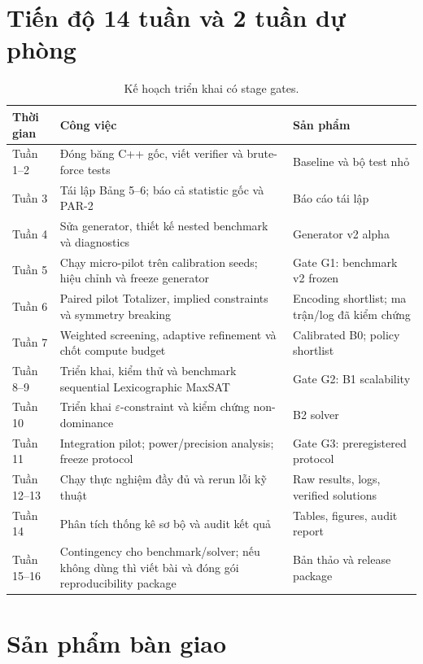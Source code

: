 \documentclass[12pt,a4paper]{article}
\begin{document}
\clearpage
\section{Tiến độ 14 tuần và 2 tuần dự phòng}

\begin{table}[H]
\centering
\caption{Kế hoạch triển khai có stage gates.}
\begin{tabularx}{\textwidth}{@{}p{2cm}Yp{4cm}@{}}
\toprule
Thời gian & Công việc & Sản phẩm \\
\midrule
Tuần 1--2 & Đóng băng C++ gốc, viết verifier và brute-force tests
           & Baseline và bộ test nhỏ \\
Tuần 3 & Tái lập Bảng 5--6; báo cả statistic gốc và PAR-2
           & Báo cáo tái lập \\
Tuần 4 & Sửa generator, thiết kế nested benchmark và diagnostics
           & Generator v2 alpha \\
Tuần 5 & Chạy micro-pilot trên calibration seeds; hiệu chỉnh và freeze generator
           & Gate G1: benchmark v2 frozen \\
Tuần 6 & Paired pilot Totalizer, implied constraints và symmetry breaking
           & Encoding shortlist; ma trận/log đã kiểm chứng \\
Tuần 7 & Weighted screening, adaptive refinement và chốt compute budget
           & Calibrated B0; policy shortlist \\
Tuần 8--9 & Triển khai, kiểm thử và benchmark sequential Lexicographic MaxSAT
           & Gate G2: B1 scalability \\
Tuần 10 & Triển khai $\varepsilon$-constraint và kiểm chứng non-dominance
           & B2 solver \\
Tuần 11 & Integration pilot; power/precision analysis; freeze protocol
           & Gate G3: preregistered protocol \\
Tuần 12--13 & Chạy thực nghiệm đầy đủ và rerun lỗi kỹ thuật
           & Raw results, logs, verified solutions \\
Tuần 14 & Phân tích thống kê sơ bộ và audit kết quả
           & Tables, figures, audit report \\
Tuần 15--16 & Contingency cho benchmark/solver; nếu không dùng thì viết bài và
               đóng gói reproducibility package
           & Bản thảo và release package \\
\bottomrule
\end{tabularx}
\end{table}

\section{Sản phẩm bàn giao}
\end{document}
